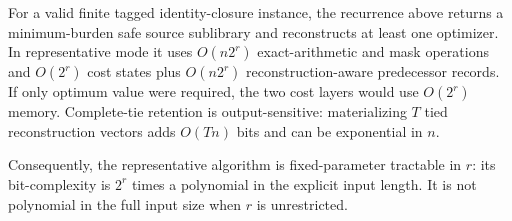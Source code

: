 \begin{theorem}
\label{thm:aor-requirement-mask-dp}
For a valid finite tagged identity-closure instance, the recurrence above
returns a minimum-burden safe source sublibrary and reconstructs at least one
optimizer.  In representative mode it uses $O(n2^r)$ exact-arithmetic and mask
operations and $O(2^r)$ cost states plus $O(n2^r)$ reconstruction-aware
predecessor records.  If only optimum value were required, the two cost layers
would use $O(2^r)$ memory.  Complete-tie retention is output-sensitive:
materializing $T$ tied reconstruction vectors adds $O(Tn)$ bits and can be
exponential in $n$.

Consequently, the representative algorithm is fixed-parameter tractable in
$r$: its bit-complexity is $2^r$ times a polynomial in the explicit input
length.  It is not polynomial in the full input size when $r$ is unrestricted.
\end{theorem}

